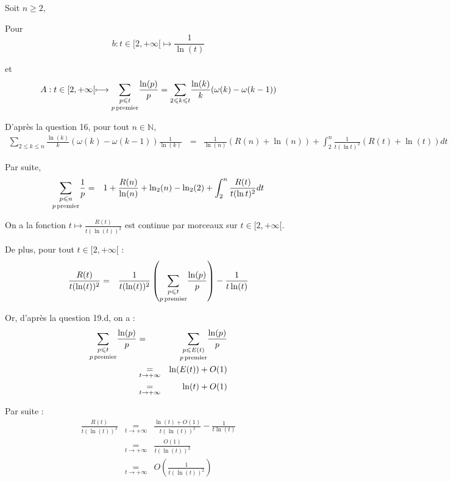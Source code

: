  Soit $n \geqslant 2$,

Pour
\[ b : t \in [2, + \infty [\longmapsto \frac{1}{\ln (t)} \]


et
\[ A : t \in [2, + \infty [\longmapsto \underset{p
   \operatorname{premier}}{\underset{p \leqslant t}{\sum}} \frac{\ln (p)}{p} =
   \underset{2 \leqslant k \leqslant t}{\sum} \frac{\ln (k)}{k} (\omega (k) -
   \omega (k - 1)) \]


D'apr{\`e}s la question 16, pour tout $n \in \mathbb{N}$,
\begin{eqnarray*}
  \underset{2 \leqslant k \leqslant n}{\sum} \frac{\ln (k)}{k} (\omega (k) -
  \omega (k - 1)) \frac{1}{\ln (k)} \frac{}{} & = & \frac{1}{\ln (n)} (R (n) +
  \ln (n)) + \int^n_2 \frac{1}{t (\ln t)^2} (R (t) + \ln (t)) d t
\end{eqnarray*}


Par suite,
\begin{eqnarray*}
  \underset{p \operatorname{premier}}{\underset{p \leqslant n}{\sum}} \frac{1}{p} & =
  & 1 + \frac{R (n)}{\ln (n)} + \ln_2 (n) - \ln_2 (2) + \int^n_2 \frac{R
  (t)}{t (\ln t)^2} d t
\end{eqnarray*}


 On a la fonction $t \longmapsto \frac{R (t)}{t (\ln (t))^2}$
est continue par morceaux sur $t \in [2, + \infty [$.

De plus, pour tout $t \in [2, + \infty [$ :
\begin{eqnarray*}
  \frac{R (t)}{t (\ln (t))^2} & = & \frac{1}{t (\ln (t))^2} \left( \underset{p
  \operatorname{premier}}{\underset{p \leqslant t}{\sum}} \frac{\ln (p)}{p} \right) -
  \frac{1}{t \ln (t)}
\end{eqnarray*}


Or, d'apr{\`e}s la question 19.d, on a :
\begin{eqnarray*}
  \underset{p \operatorname{premier}}{\underset{p \leqslant t}{\sum}} \frac{\ln
  (p)}{p} & = & \underset{p \operatorname{premier}}{\underset{p \leqslant E
  (t)}{\sum}} \frac{\ln (p)}{p}\\
  & \underset{t \rightarrow + \infty}{=} & \ln (E (t)) + O (1)\\
  & \underset{t \rightarrow + \infty}{=} & \ln (t) + O (1)
\end{eqnarray*}


Par suite :
\begin{eqnarray*}
  \frac{R (t)}{t (\ln (t))^2} & \underset{t \rightarrow + \infty}{=} &
  \frac{\ln (t) + O (1)}{t (\ln (t))^2} - \frac{1}{t \ln (t)}\\
  & \underset{t \rightarrow + \infty}{=} & \frac{O (1)}{t (\ln (t))^2}\\
  & \underset{t \rightarrow + \infty}{=} & O \left( \frac{1}{t (\ln (t))^2}
  \right)
\end{eqnarray*}


